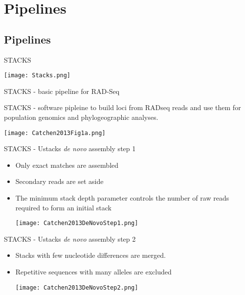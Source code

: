 \documentclass[presentation]{beamer}
\begin{document}
\section{Pipelines}
\label{sec-4}
\subsection{Pipelines}
\label{sec-4-1}


\begin{frame}[label=sec-4-1-1]{STACKS \citep{Puritz2014}}
\begin{center}

\texttt{[image: Stacks.png]}

\end{center}
\end{frame}
\begin{frame}[label=sec-4-1-2]{STACKS - basic pipeline for RAD-Seq}
\begin{center}
STACKS - software pipleine to build loci from RADseq reads and use
them for population genomics and phylogeographic analyses.

\texttt{[image: Catchen2013Fig1a.png]}

\tiny{\citep{Catchen2013a}}
\end{center}
\end{frame}


\begin{frame}[label=sec-4-1-3]{STACKS - Ustacks \emph{de novo} assembly step 1}
\begin{itemize}
\item Only exact matches are assembled
\item Secondary reads are set aside
\item The minimum stack depth parameter controls the number of raw reads  required to form an initial stack
\begin{center}
\texttt{[image: Catchen2013DeNovoStep1.png]}

\tiny{\citep{Catchen2013a}}
\end{center}
\end{itemize}
\end{frame}




\begin{frame}[label=sec-4-1-4]{STACKS - Ustacks \emph{de novo} assembly step 2}
\begin{itemize}
\item Stacks with few nucleotide differences are merged.
\item Repetitive sequences with many alleles are excluded
\begin{center}
\texttt{[image: Catchen2013DeNovoStep2.png]}

\tiny{\citep{Catchen2013a}}
\end{center}
\end{itemize}
\end{frame}
\end{document}

